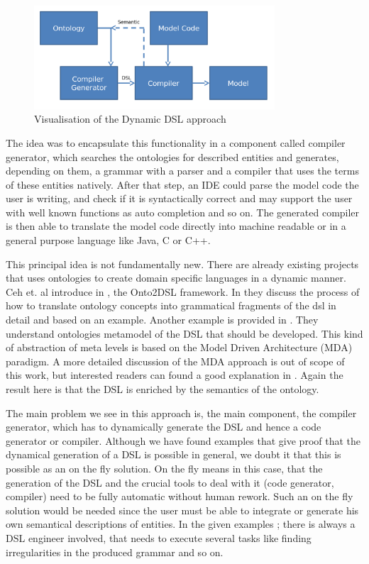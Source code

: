 \begin{figure}[h]
	\centering
	\includegraphics[width=0.8\textwidth]{pics/generation_of_a_dsl/binding1.png}
	\caption{Visualisation of the Dynamic DSL approach \label{fig:visualisation_dyn_dsl}}	
\end{figure}
\par
The idea was to encapsulate this functionality in a component called compiler generator, which searches the ontologies for described entities and generates, depending on them, a grammar with a parser and a compiler that uses the terms of these entities natively. After that step, an IDE could parse the model code the user is writing, and check if it is syntactically correct and may support the user with well known functions as auto completion and so on. The generated compiler is then able to translate the model code directly into machine readable or in a general purpose language like Java, C or C++.
\par
This principal idea is not fundamentally new. There are already existing projects that uses ontologies to create domain specific languages in a dynamic manner. Ceh et. al introduce in \autocite{ontology:ontology2dsl}, \autocite{ontology:onto_in_dsl_dev} the Onto2DSL framework. In \autocite[192]{ontology:onto_in_dsl_dev} they discuss the process of how to translate ontology concepts into grammatical fragments of the dsl in detail and based on an example. Another example is provided in \autocite{ontology:combining_dsl_onto}. They understand ontologies metamodel of the DSL that should be developed. This kind of abstraction of meta levels is based on the Model Driven Architecture (MDA) paradigm. A  more detailed discussion of the MDA approach is out of scope of this work, but interested readers can found a good explanation in \autocite{dsl:mda}. Again the result here is that the DSL is enriched by the semantics of the ontology.
\par
The main problem we see in this approach is, the main component, the compiler generator, which has to dynamically generate the DSL and hence a code generator or compiler. Although we have found examples that give proof that the dynamical generation of a DSL is possible in general, we doubt it that this is possible as an on the fly solution. On the fly means in this case, that the generation of the DSL and the crucial tools to deal with it (code generator, compiler) need to be fully automatic without human rework. Such an on the fly solution would be needed since the user must be able to integrate or generate his own semantical descriptions of entities. In the given examples \autocite{ontology:ontology2dsl}; \autocite{ontology:onto_in_dsl_dev} there is always a DSL engineer involved, that needs to execute several tasks like finding irregularities in the produced grammar and so on.

